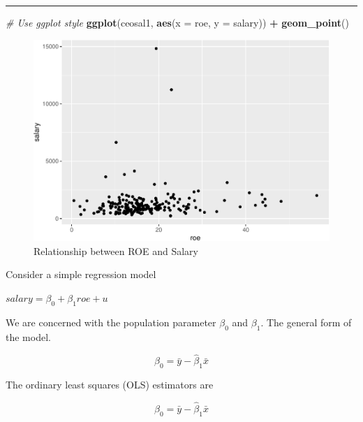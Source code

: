 \documentclass[]{book}
\newenvironment{Shaded}{\begin{snugshade}}{\end{snugshade}}
\newcommand{\CommentTok}[1]{\textcolor[rgb]{0.56,0.35,0.01}{\textit{#1}}}
\newcommand{\DataTypeTok}[1]{\textcolor[rgb]{0.13,0.29,0.53}{#1}}
\newcommand{\KeywordTok}[1]{\textcolor[rgb]{0.13,0.29,0.53}{\textbf{#1}}}
\newcommand{\NormalTok}[1]{#1}
\newcommand{\OperatorTok}[1]{\textcolor[rgb]{0.81,0.36,0.00}{\textbf{#1}}}
\newcommand{\StringTok}[1]{\textcolor[rgb]{0.31,0.60,0.02}{#1}}
\begin{document}
\begin{center}\rule{0.5\linewidth}{\linethickness}\end{center}

\begin{Shaded}
\begin{Highlighting}[]
\CommentTok{# Use ggplot style}
\KeywordTok{ggplot}\NormalTok{(ceosal1, }\KeywordTok{aes}\NormalTok{(}\DataTypeTok{x =}\NormalTok{ roe, }\DataTypeTok{y =}\NormalTok{ salary)) }\OperatorTok{+}
\StringTok{  }\KeywordTok{geom_point}\NormalTok{()}
\end{Highlighting}
\end{Shaded}

\begin{figure}
\centering
\includegraphics{MEM5220_R_files/figure-latex/ceosal1-1.pdf}
\caption{\label{fig:ceosal1}Relationship between ROE and Salary}
\end{figure}

Consider a simple regression model

\(salary = \beta_0 + \beta_1roe + u\)

We are concerned with the population parameter \(\beta_{0}\) and
\(\beta_{1}\). The general form of the model.

\begin{equation}
\hat{\beta}_{0} = \bar{y} - \hat{\beta}_{1}\bar{x}
\label{eq:populationparameterBeta0}
\end{equation}

The ordinary least squares (OLS) estimators are

\begin{equation}
\hat{\beta}_{0} = \bar{y} - \hat{\beta}_{1}\bar{x}
\label{eq:OLSestimator}
\end{equation}
\end{document}
